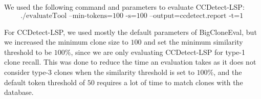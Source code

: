 We used the following command and parameters to evaluate CCDetect-LSP:
$$
\text{./evaluateTool --min-tokens=100 -s=100 --output=ccdetect.report -t=1 }
$$

For CCDetect-LSP, we used mostly the default parameters of BigCloneEval, but we increased
the minimum clone size to $100$ and set the minimum similarity threshold to be $100\%$,
since we are only evaluating CCDetect-LSP for type-1 clone recall. This was done to reduce
the time an evaluation takes as it does not consider type-3 clones when the similarity
threshold is set to $100\%$, and the default token threshold of $50$ requires a lot of
time to match clones with the database.

